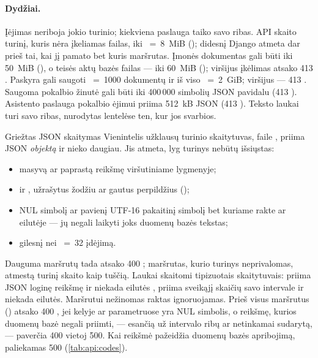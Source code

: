 \paragraph{Dydžiai.} Įėjimas neriboja jokio turinio; kiekviena paslauga taiko savo ribas. API
skaito turinį, kuris nėra įkeliamas failas, iki ~=~8~MiB
(); didesnį Django atmeta dar prieš tai, kai jį pamato bet kuris maršrutas.
Įmonės dokumentas gali būti iki 50~MiB (), o teisės aktų bazės failas ---
iki 60~MiB (); viršijus įkėlimas atsako 413 .
Paskyra gali saugoti ~=~1000 dokumentų ir iš viso
~=~2~GiB; viršijus --- 413 . Saugoma pokalbio žinutė
gali būti iki 400\,000 simbolių JSON pavidalu (413 ). Asistento paslauga
pokalbio ėjimui priima 512~kB JSON (413 ). Teksto laukai turi savo ribas,
nurodytas lentelėse ten, kur jos svarbios.

\begin{codebox}{Griežtas JSON skaitymas}
Vienintelis užklausų turinio skaitytuvas,  faile ,
priima JSON \emph{objektą} ir nieko daugiau. Jis atmeta, lyg turinys nebūtų išsiųstas:
\begin{itemize}
  \item masyvą ar paprastą reikšmę viršutiniame lygmenyje;
  \item {} ir , užrašytus žodžiu ar gautus perpildžius ();
  \item NUL simbolį ar pavienį UTF-16 pakaitinį simbolį bet kuriame rakte ar eilutėje --- jų
    negali laikyti joks duomenų bazės tekstas;
  \item gilesnį nei ~=~32 įdėjimą.
\end{itemize}
Dauguma maršrutų tada atsako 400 ; maršrutas, kurio turinys neprivalomas,
atmestą turinį skaito kaip tuščią. Laukai skaitomi tipizuotais skaitytuvais: 
priima JSON loginę reikšmę ir niekada eilutės ,  priima sveikąjį
skaičių savo intervale ir niekada eilutės. Maršrutui nežinomas raktas ignoruojamas. Prieš visus
maršrutus  () atsako 400
, jei kelyje ar parametruose yra NUL simbolis, o reikšmę, kurios duomenų bazė
negali priimti, --- esančią už intervalo ribų ar netinkamai sudarytą, ---
paverčia 400  vietoj 500. Kai reikšmė pažeidžia duomenų bazės apribojimą,
paliekamas 500 (\cref{tab:api:codes}).
\end{codebox}


